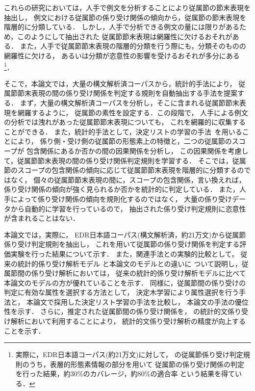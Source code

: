 これらの研究においては，人手で例文を分析することにより従属節の節末表現を抽出し，
例文における従属節の係り受け関係の傾向から，従属節の節末表現を階層的に分類している．
しかし，人手で分析できる例文の量には限りがあるため，このようにして抽出された
従属節節末表現は網羅性に欠けるおそれがある．
また，人手で従属節節末表現の階層的分類を行う際にも，分類そのものの網羅性に欠ける，
あるいは分類が恣意性の影響を受けるおそれが多分にある
\footnote{
  実際に，EDR日本語コーパス\cite{EDR95aj-nlp}(約21万文)に対して，
  \cite{SShirai95bj}の従属節係り受け判定規則のうち，表層的形態素情報の部分を用いて
  従属節の係り受け関係の判定を行った結果，約30\%のカバレージ，約80\%の適合率
  という結果を得ている\cite{Nishiokayama98aj}．
}．

そこで，本論文では，大量の構文解析済コーパスから，統計的手法により，
従属節節末表現の間の係り受け関係を判定する規則を自動抽出する手法を提案する．
まず，大量の構文解析済コーパスを分析し，そこに含まれる従属節節末表現を網羅するように，
従属節の素性を設定する．この段階で，
人手による例文の分析では洩れがあった従属節節末表現についても，
これを網羅的に収集することができる．
また，統計的手法として，決定リストの学習の手法~\cite{Yarowsky94a}を用いることにより，
係り側・受け側の従属節の形態素上の特徴と，二つの従属節のスコープが
包含関係にあるか否かの間の因果関係を分析し，
この因果関係を考慮して，従属節節末表現の間の係り受け関係判定規則を学習する．
そこでは，従属節のスコープの包含関係の傾向に応じて従属節節末表現を階層的に分類するのではなく，
個々の従属節節末表現の間に，スコープの包含関係，言い換えれば，
係り受け関係の傾向が強く見られるか否かを統計的に判定している．
また，人手によって係り受け関係の傾向を規則化するのではなく，
大量の係り受けデータから自動的に学習を行っているので，
抽出された係り受け判定規則に恣意性が含まれることはない．

本論文では，実際に，
EDR日本語コーパス\cite{EDR95aj-nlp}(構文解析済，約21万文)から従属節係り受け判定規則を抽出し，
これを用いて従属節の係り受け関係を判定する評価実験を行った結果について示す．
また，関連手法との実験的比較として，
従来の統計的係り受け解析モデル
\cite{Collins96a,Fujio97aj,Ehara98aj,Haruno98cj,Uchimoto98aj}と本論文のモデルとの違いに
ついて説明し，従属節間の係り受け解析においては，
従来の統計的係り受け解析モデルに比べて本論文のモデルの方が優れていることを示す．
同様に，従属節間の係り受けの判定に有効な属性を選択する方法として，
決定木学習\cite{Quinlan93a}により属性選択を行う手法\cite{Haruno98cj}と，
本論文で採用した決定リスト学習の手法\cite{Yarowsky94a}を比較し，
本論文の手法の優位性を示す．
さらに，推定された従属節間の係り受け関係を，
\cite{Fujio97aj,Fujio99aj}の統計的文係り受け解析において利用することにより，
統計的文係り受け解析の精度が向上することを示す．


